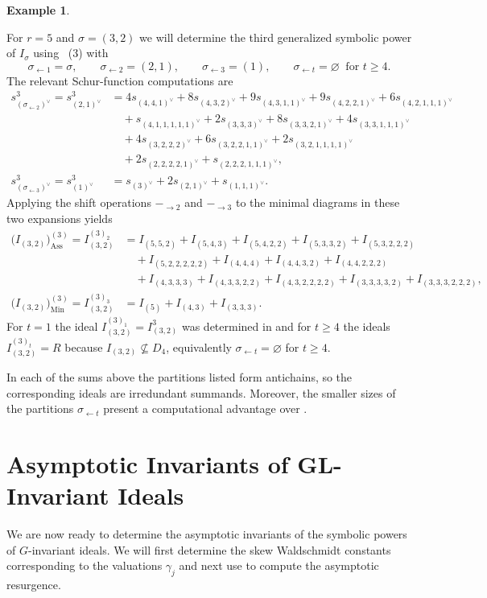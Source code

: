 \documentclass[11pt, reqno]{amsart}
\numberwithin{equation}{section}
\theoremstyle{definition}
\newtheorem{example}[theorem]{Example}
\DeclareMathOperator{\Ass}{Ass}
\DeclareMathOperator{\Min}{Min}
\newcommand{\s}{\sigma}
\begin{document}
\begin{example}\label{ex: 2}

For $r=5$ and $\s=(3,2)$  we will determine the third generalized symbolic power of $I_\s$ using  ~(3)  with
\[
\sigma_{\leftarrow1}=\sigma,\qquad
\sigma_{\leftarrow2}=(2,1),\qquad
\sigma_{\leftarrow3}=(1),\qquad
\sigma_{\leftarrow t}=\varnothing\ \text{ for }t\geq4.
\]
The relevant Schur-function computations are
\begin{align*}
s_{(\sigma_{\leftarrow2})^\vee}^3=s_{(2,1)^\vee}^3
 &=4s_{(4,4,1)^\vee}+8s_{(4,3,2)^\vee}+9s_{(4,3,1,1)^\vee}
   +9s_{(4,2,2,1)^\vee}+6s_{(4,2,1,1,1)^\vee}\\
 &\quad+s_{(4,1,1,1,1,1)^\vee}+2s_{(3,3,3)^\vee}+8s_{(3,3,2,1)^\vee}
   +4s_{(3,3,1,1,1)^\vee}\\
 &\quad+4s_{(3,2,2,2)^\vee}+6s_{(3,2,2,1,1)^\vee}
   +2s_{(3,2,1,1,1,1)^\vee}\\
 &\quad+2s_{(2,2,2,2,1)^\vee}+s_{(2,2,2,1,1,1)^\vee},\\
s_{(\sigma_{\leftarrow3})^\vee}^3=s_{(1)^\vee}^3
 &=s_{(3)^\vee}+2s_{(2,1)^\vee}+s_{(1,1,1)^\vee}.
\end{align*}
Applying the shift operations ${-}_{\rightarrow2}$ and ${-}_{\rightarrow3}$ to
the minimal diagrams in these two expansions yields
\begin{align*}
\bigl(I_{(3,2)}\bigr)_{\Ass}^{(3)}=I_{(3,2)}^{(3)_2}
 &=I_{(5,5,2)}+I_{(5,4,3)}+I_{(5,4,2,2)}+I_{(5,3,3,2)}
   +I_{(5,3,2,2,2)}\\
 &\quad+I_{(5,2,2,2,2,2)}+I_{(4,4,4)}+I_{(4,4,3,2)}
   +I_{(4,4,2,2,2)}\\
 &\quad+I_{(4,3,3,3)}+I_{(4,3,3,2,2)}+I_{(4,3,2,2,2,2)}
   +I_{(3,3,3,3,2)}+I_{(3,3,3,2,2,2)},\\
\bigl(I_{(3,2)}\bigr)_{\Min}^{(3)}=I_{(3,2)}^{(3)_3}
 &=I_{(5)}+I_{(4,3)}+I_{(3,3,3)}.
\end{align*}
For $t=1$ the ideal $I_{(3,2)}^{(3)_1}=I_{(3,2)}^{3}$ was determined in  and for $t\geq4$ the ideals $I_{(3,2)}^{(3)_t}=R$ because $I_{(3,2)}\not\subseteq D_4$, equivalently  $\sigma_{\leftarrow t}=\varnothing$ for $t\geq4$.

In each of the sums above the partitions listed form antichains, so the corresponding ideals are irredundant summands. Moreover, the smaller sizes of the partitions $\sigma_{\leftarrow t}$ present a computational advantage over  .
\end{example}

\section{Asymptotic Invariants of GL-Invariant Ideals}\label{s: asymptotic}
We are now ready to determine the asymptotic invariants of the symbolic powers of  $G$-invariant ideals. We will  first determine the skew Waldschmidt constants corresponding to the valuations $\gamma_j$ and next use  to compute the asymptotic resurgence.
\end{document}
